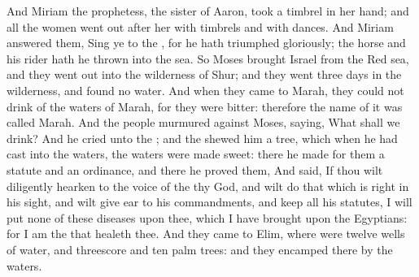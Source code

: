 \begin{biblechapter}
\verse And Miriam the prophetess, the sister of Aaron, took a timbrel in her hand; and all the women went out after her with timbrels and with dances.
\verse And Miriam answered them, Sing ye to the \LORD, for he hath triumphed gloriously; the horse and his rider hath he thrown into the sea.
 So Moses brought Israel from the Red sea, and they went out into the wilderness of Shur; and they went three days in the wilderness, and found no water.
\verse And when they came to Marah, they could not drink of the waters of Marah, for they were bitter: therefore the name of it was called Marah.
\verse And the people murmured against Moses, saying, What shall we drink?
\verse And he cried unto the \LORD; and the \LORD shewed him a tree, which when he had cast into the waters, the waters were made sweet: there he made for them a statute and an ordinance, and there he proved them,
\verse And said, If thou wilt diligently hearken to the voice of the \LORD thy God, and wilt do that which is right in his sight, and wilt give ear to his commandments, and keep all his statutes, I will put none of these diseases upon thee, which I have brought upon the Egyptians: for I am the \LORD that healeth thee.
\verse And they came to Elim, where were twelve wells of water, and threescore and ten palm trees: and they encamped there by the waters.
\end{biblechapter}

